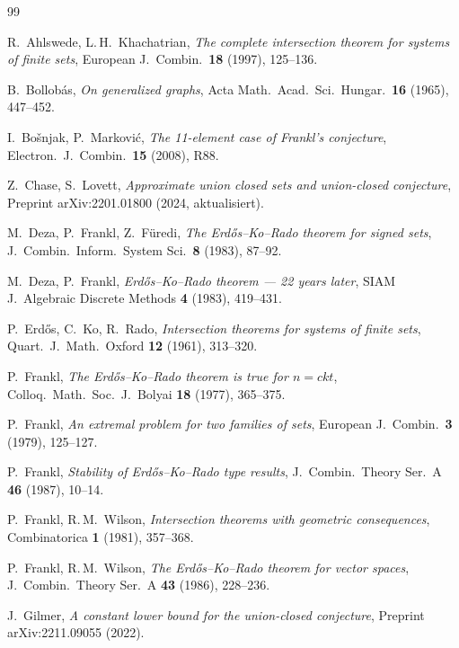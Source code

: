 \documentclass[12pt,a4paper]{amsart}
\theoremstyle{definition}
\theoremstyle{remark}
\begin{document}
\begin{thebibliography}{99}

R.~Ahlswede, L.\,H.~Khachatrian,
\textit{The complete intersection theorem for systems of finite sets},
European J.\ Combin.\ \textbf{18} (1997), 125--136.

B.~Bollobás,
\textit{On generalized graphs},
Acta Math.\ Acad.\ Sci.\ Hungar.\ \textbf{16} (1965), 447--452.

I.~Bošnjak, P.~Marković,
\textit{The 11-element case of Frankl's conjecture},
Electron.\ J.\ Combin.\ \textbf{15} (2008), R88.

Z.~Chase, S.~Lovett,
\textit{Approximate union closed sets and union-closed conjecture},
Preprint arXiv:2201.01800 (2024, aktualisiert).

M.~Deza, P.~Frankl, Z.~Füredi,
\textit{The Erdős--Ko--Rado theorem for signed sets},
J.\ Combin.\ Inform.\ System Sci.\ \textbf{8} (1983), 87--92.

M.~Deza, P.~Frankl,
\textit{Erdős--Ko--Rado theorem --- 22 years later},
SIAM J.\ Algebraic Discrete Methods \textbf{4} (1983), 419--431.

P.~Erd\H{o}s, C.~Ko, R.~Rado,
\textit{Intersection theorems for systems of finite sets},
Quart.\ J.\ Math.\ Oxford \textbf{12} (1961), 313--320.

P.~Frankl,
\textit{The Erdős--Ko--Rado theorem is true for $n = ckt$},
Colloq.\ Math.\ Soc.\ J.\ Bolyai \textbf{18} (1977), 365--375.

P.~Frankl,
\textit{An extremal problem for two families of sets},
European J.\ Combin.\ \textbf{3} (1979), 125--127.

P.~Frankl,
\textit{Stability of Erdős--Ko--Rado type results},
J.\ Combin.\ Theory Ser.\ A \textbf{46} (1987), 10--14.

P.~Frankl, R.\,M.~Wilson,
\textit{Intersection theorems with geometric consequences},
Combinatorica \textbf{1} (1981), 357--368.

P.~Frankl, R.\,M.~Wilson,
\textit{The Erdős--Ko--Rado theorem for vector spaces},
J.\ Combin.\ Theory Ser.\ A \textbf{43} (1986), 228--236.

J.~Gilmer,
\textit{A constant lower bound for the union-closed conjecture},
Preprint arXiv:2211.09055 (2022).


\end{thebibliography}
\end{document}
